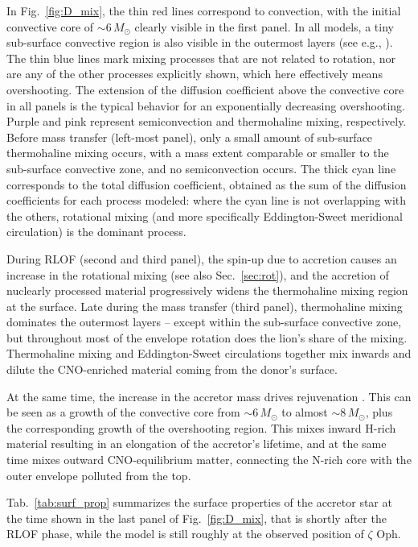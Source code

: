 \documentclass[twocolumn,twocolappendix,trackchanges]{aastex63}
\DeclareRobustCommand{\Figref}[1]{Fig.~\ref{#1}}
\DeclareRobustCommand{\Tabref}[1]{Tab.~\ref{#1}}
\DeclareRobustCommand{\Secref}[1]{Sec.~\ref{#1}}
\newcommand{\zoph}{$\zeta$ Oph}
\begin{document}
In \Figref{fig:D_mix}, the thin red lines correspond to convection,
with the initial convective core of
$\sim$$6\,M_\odot$ clearly visible in the first panel. In all models, a tiny sub-surface convective region is also visible in the outermost layers (see e.g., \citealt{cantiello:21}).  The thin blue lines mark mixing processes that are not related to rotation, nor are any of the other processes explicitly shown, which here effectively means overshooting. The extension of the diffusion coefficient above the convective core in all panels is the typical behavior for an exponentially decreasing overshooting. Purple and pink represent semiconvection and thermohaline mixing, respectively. Before mass transfer (left-most panel), only a small amount of sub-surface thermohaline mixing occurs, with a mass extent comparable or smaller to the sub-surface convective zone, and no semiconvection occurs. The thick cyan line corresponds to the total diffusion coefficient, obtained as the sum of the diffusion coefficients for each process modeled: where the cyan line is not overlapping with the others, rotational mixing (and more specifically Eddington-Sweet meridional circulation) is the dominant process.

During RLOF (second and third panel), the spin-up due to accretion causes an increase in the rotational mixing (see also \Secref{sec:rot}), and the accretion of nuclearly processed material progressively widens the thermohaline mixing region at the surface. Late during the mass transfer (third panel), thermohaline mixing dominates the outermost layers -- except within the sub-surface convective zone, but throughout most of the envelope rotation does the lion's share of the mixing. Thermohaline mixing and Eddington-Sweet circulations together mix inwards and dilute the CNO-enriched material coming from the donor's surface.

At the same time, the increase in the accretor mass drives
rejuvenation \citep[e.g.,][]{schneider:16}. This can be seen as a
growth of the convective core from
$\sim$$6\,M_\odot$ to almost $\sim$$8\,M_\odot$, plus the
corresponding growth of the overshooting region. This mixes inward
H-rich material resulting in an elongation of the accretor's lifetime,
and at the same time mixes outward CNO-equilibrium matter, connecting
the N-rich core with the outer envelope polluted from the top.



\Tabref{tab:surf_prop} summarizes the surface properties of the
accretor star at the time shown in the last panel of
\Figref{fig:D_mix}, that is shortly after the RLOF phase, while the
model is still roughly at the observed position of \zoph.
\end{document}
